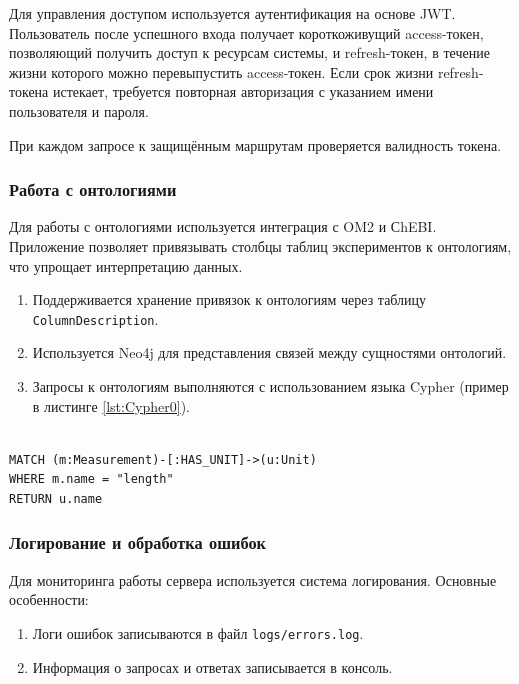 Для управления доступом используется аутентификация на основе JWT. Пользователь после успешного входа получает короткоживущий access-токен, позволяющий получить доступ к ресурсам системы, и refresh-токен, в течение жизни которого можно перевыпустить access-токен. Если срок жизни refresh-токена истекает, требуется повторная авторизация с указанием имени пользователя и пароля.

При каждом запросе к защищённым маршрутам проверяется валидность токена.

\subsubsection{Работа с онтологиями}

Для работы с онтологиями используется интеграция с OM2 и СhEBI. Приложение позволяет привязывать столбцы таблиц экспериментов к онтологиям, что упрощает интерпретацию данных.

\begin{enumerate}
    \item Поддерживается хранение привязок к онтологиям через таблицу \texttt{ColumnDescription}.
    \item Используется Neo4j для представления связей между сущностями онтологий.
    \item Запросы к онтологиям выполняются с использованием языка Cypher (пример в листинге \ref{lst:Cypher0}).
\end{enumerate}

\begin{lstlisting}[frame=single, basicstyle=\footnotesize\ttfamily, label={lst:Cypher0}, caption={Пример запроса к Neo4j для поиска онтологических связей},captionpos=b, breaklines=true, breakatwhitespace=true]

MATCH (m:Measurement)-[:HAS_UNIT]->(u:Unit)
WHERE m.name = "length"
RETURN u.name
\end{lstlisting}

\subsubsection{Логирование и обработка ошибок}

Для мониторинга работы сервера используется система логирования. Основные особенности:

\begin{enumerate}
    \item Логи ошибок записываются в файл \texttt{logs/errors.log}.
    \item Информация о запросах и ответах записывается в консоль.
\end{enumerate}

